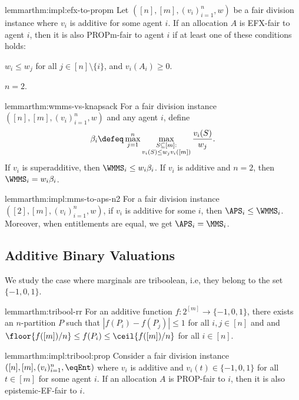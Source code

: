 \begin{restatable}{lemma}{rthm:impl:efx-to-propm}
\label{thm:impl:efx-to-propm}
Let $([n], [m], (v_i)_{i=1}^n, w)$ be a fair division instance
where $v_i$ is additive for some agent $i$.
If an allocation $A$ is EFX-fair to agent $i$, then it is also PROPm-fair to agent $i$
if at least one of these conditions holds:
\begin{tightenum}
\item $w_i \le w_j$ for all $j \in [n] \setminus \{i\}$, and $v_i(A_i) \ge 0$.
\item $n=2$.
\end{tightenum}
\end{restatable}

\begin{restatable}{lemma}{rthm:wmms-vs-knapsack}
\label{thm:wmms-vs-knapsack}
For a fair division instance $([n], [m], (v_i)_{i=1}^n, w)$ and any agent $i$, define
\[ \beta_i \defeq \max_{j=1}^n \max_{\substack{S \subseteq [m]:\\v_i(S) \le w_jv_i([m])}} \frac{v_i(S)}{w_j}. \]
If $v_i$ is superadditive, then $\WMMS_i \le w_i\beta_i$.
If $v_i$ is additive and $n = 2$, then $\WMMS_i = w_i\beta_i$.
\end{restatable}

\begin{restatable}[WMMS$\implies$APS for $n=2$]{lemma}{rthm:impl:mms-to-aps-n2}
\label{thm:impl:mms-to-aps-n2}
For a fair division instance $([2], [m], (v_i)_{i=1}^n, w)$,
if $v_i$ is additive for some $i$, then $\APS_i \le \WMMS_i$.
Moreover, when entitlements are equal, we get $\APS_i = \MMS_i$.
\end{restatable}

\subsection{Additive Binary Valuations}

We study the case where marginals are triboolean, i.e, they belong to the set $\{-1, 0, 1\}$.

\begin{restatable}{lemma}{rthm:tribool-rr}
\label{thm:tribool-rr}
For an additive function $f: 2^{[m]} \to \{-1, 0, 1\}$,
there exists an $n$-partition $P$ such that $|f(P_i) - f(P_j)| \le 1$
for all $i, j \in [n]$ and
and $\floor{f([m])/n} \le f(P_i) \le \ceil{f([m])/n}$ for all $i \in [n]$.
\end{restatable}

\begin{restatable}{lemma}{rthm:impl:tribool:prop}
\label{thm:impl:tribool:prop}
Consider a fair division instance $([n], [m], (v_i)_{i=1}^n, \eqEnt)$
where $v_i$ is additive and $v_i(t) \in \{-1, 0, 1\}$ for all $t \in [m]$ for some agent $i$.
If an allocation $A$ is PROP-fair to $i$, then it is also epistemic-EF-fair to $i$.
\end{restatable}

